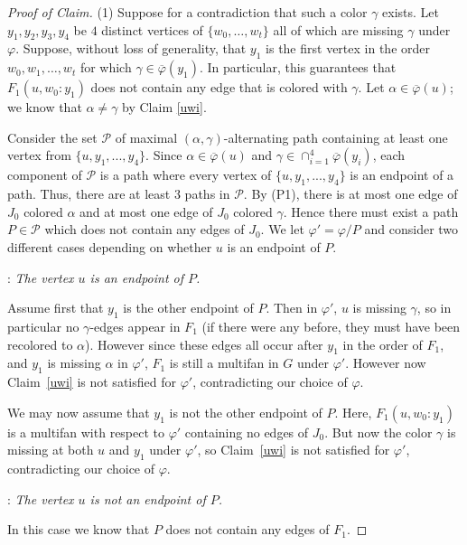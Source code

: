 \documentclass[11pt, oneside]{article}
\newcommand{\pbar}{\overline{\varphi}}
\newenvironment{proofc}{\begin{proof}[Proof of Claim]}{\end{proof}}
\begin{document}
\begin{proofc}  
(1) Suppose for a contradiction that such a color $\gamma$ exists.  Let  $y_1, y_2, y_3,  y_{4}$ be $4$  distinct vertices of $\{w_0, \ldots, w_t\}$ all of which are missing $\gamma$ under $\varphi$. Suppose, without loss of generality, that $y_1$ is the first vertex 
in the order $w_0, w_1, \ldots, w_t$ for which $\gamma\in \pbar(y_1)$.  In particular, this guarantees that $F_1(u, w_0:y_1)$ does not contain any edge that is colored with $\gamma$. 
Let $\alpha\in \pbar(u)$; we know that $\alpha\ne \gamma$ by Claim \ref{uwi}. 



Consider the set $\mathcal{P}$ of maximal $(\alpha,\gamma)$-alternating
path containing at least one vertex from $\{u,y_1,...,y_4\}$. Since $\alpha\in \pbar(u)$ and $\gamma\in \cap_{i=1}^4\pbar(y_i)$, each component of $\mathcal{P}$ is a path where every vertex of $\{u,y_1,...,y_4\}$ is an endpoint of a path. Thus, there are at least $3$ paths in $\mathcal{P}$. By (P1), there is at most one edge of $J_0$ colored $\alpha$ and at most one edge of $J_0$ colored $\gamma$. Hence there must exist a path $P\in \mathcal{P}$ which does not contain any edges of $J_0$. We let $\varphi' = \varphi/P$ and consider two different cases depending on whether $u$ is an endpoint of $P$.

:  \emph{The vertex $u$ is an endpoint of $P$.}


Assume first that $y_1$ is the other endpoint of $P$. Then in $\varphi'$, $u$ is missing $\gamma$, so in particular no $\gamma$-edges appear in $F_1$ (if there were any before, they must have been recolored to $\alpha$). However since these edges all occur after $y_1$ in the order of  $F_1$, and $y_1$ is missing $\alpha$ in $\varphi'$, $F_1$ is still a multifan in $G$ under $\varphi'$. However now Claim~\ref{uwi} is not satisfied for $\varphi'$, contradicting  our choice of $\varphi$.

We may now assume that $y_1$ is not the other endpoint of $P$. Here, $F_1(u, w_0:y_1)$ is a multifan with respect to $\varphi'$ containing no edges of $J_0$. But now the color $\gamma$ is missing at both $u$ and $y_1$ under $\varphi'$, so Claim~\ref{uwi} is not satisfied for $\varphi'$, contradicting our choice of $\varphi$. 


:  \emph{The vertex $u$ is not an endpoint of $P$.}   

In this case we know that $P$ does not contain any edges of $F_1$. 


\end{proofc}
\end{document}
